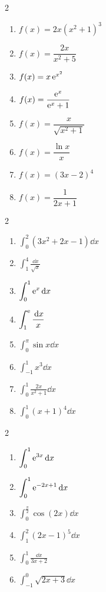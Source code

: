 \begin{multicols}{2}
\begin{enumerate}
	\item $f(x)=2x(x^{2}+1)^{3}$
	\item $f(x)=\dfrac{2x}{x^{2}+5}$
	\item $f(x)=x\,\mathrm{e}^{x^{2}}$
	\item $f(x)=\dfrac{\mathrm{e}^{x}}{\mathrm{e}^{x}+1}$
	\item $f(x)=\dfrac{x}{\sqrt{x^{2}+1}}$
	\item $f(x)=\dfrac{\ln x}{x}$
	\item $f(x)=(3x-2)^{4}$
	\item $f(x)=\dfrac{1}{2x+1}$
\end{enumerate}
\end{multicols}

\begin{multicols}{2}
\begin{enumerate}
	\item $\displaystyle\int_0^{2}(3x^{2}+2x-1)\dd x$
	\item $\displaystyle\int_1^{4}\frac{\dd x}{\sqrt{x}}$
	\item $\displaystyle\int_0^{1}\mathrm{e}^{x}\,\mathrm{d} x$
	\item $\displaystyle\int_1^{\mathrm{e}}\frac{\,\mathrm{d} x}{x}$
	\item $\displaystyle\int_0^{\pi}\sin x\dd x$
	\item $\displaystyle\int_{-1}^{1}x^{3}\dd x$
	\item $\displaystyle\int_0^{1}\frac{2x}{x^{2}+1}\dd x$
	\item $\displaystyle\int_0^{1}(x+1)^{4}\dd x$
\end{enumerate}
\end{multicols}

\begin{multicols}{2}
\begin{enumerate}
	\item $\displaystyle\int_0^{1}\mathrm{e}^{3x}\,\mathrm{d} x$
	\item $\displaystyle\int_0^{1}\mathrm{e}^{-2x+1}\,\mathrm{d} x$
	\item $\displaystyle\int_0^{\frac{\pi}{2}}\cos(2x)\dd x$
	\item $\displaystyle\int_1^{2}(2x-1)^{5}\dd x$
	\item $\displaystyle\int_0^{1}\frac{\dd x}{3x+2}$
	\item $\displaystyle\int_{-1}^{0}\sqrt{2x+3}\dd x$
\end{enumerate}
\end{multicols}

